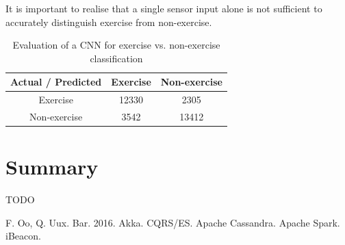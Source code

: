\documentclass[a4paper, 10 pt, conference]{IEEEtran}
\begin{document}
It is important to realise that a single sensor input alone is not sufficient to accurately distinguish exercise from non-exercise. 

\begin{table}[h]
\caption{Evaluation of a CNN for exercise vs. non-exercise classification}
\label{exercise}
\begin{center}
\begin{tabular}{|c||c||c|}
\hline
Actual / Predicted & Exercise & Non-exercise\\
\hline
Exercise & 12330 & 2305\\
\hline
Non-exercise & 3542 & 13412\\
\hline
\end{tabular}
\end{center}
\end{table}

\section{Summary}

TODO

\addtolength{\textheight}{-12cm}  %

\begin{thebibliography}{99}

 F. Oo, Q. Uux. Bar. 2016.
 Akka.
 CQRS/ES.
 Apache Cassandra.
 Apache Spark.
 iBeacon.

\end{thebibliography}
\end{document}
